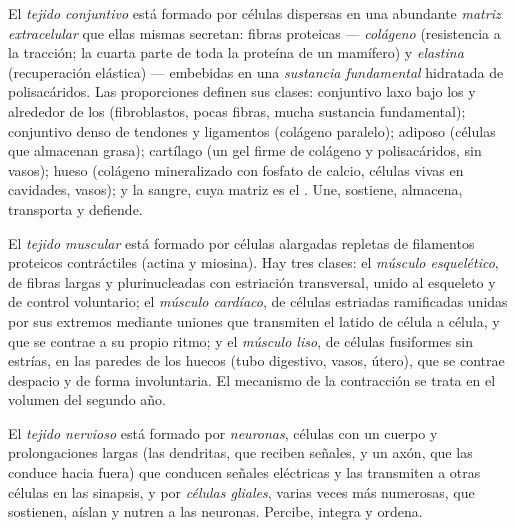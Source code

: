 \begin{definition}\label{def:b1:body-plans-tissues:connective}
El \emph{tejido conjuntivo} está formado por
células dispersas en una abundante \emph{matriz extracelular} que ellas mismas secretan: fibras proteicas ---
\emph{colágeno} (resistencia a la tracción; la cuarta parte
de toda la proteína de un mamífero) y \emph{elastina}
(recuperación elástica) --- embebidas en una \emph{sustancia fundamental}
hidratada de polisacáridos. Las proporciones definen sus clases: 
conjuntivo laxo bajo los  y alrededor de los  (fibroblastos,
pocas fibras, mucha sustancia fundamental);  conjuntivo denso de
tendones y ligamentos (colágeno paralelo);  adiposo (células que
almacenan grasa); cartílago (un gel firme de colágeno y polisacáridos, sin
vasos); hueso (colágeno mineralizado con fosfato de calcio, células vivas en
cavidades, vasos); y la sangre, cuya matriz es el . Une, sostiene,
almacena, transporta y defiende.
\end{definition}

\begin{definition}\label{def:b1:body-plans-tissues:muscle}
El \emph{tejido muscular} está formado por células
alargadas repletas de filamentos proteicos contráctiles (actina y miosina).
Hay tres clases: el \emph{músculo esquelético}, de fibras largas y
plurinucleadas con estriación transversal, unido al esqueleto y de control
voluntario; el \emph{músculo cardíaco}, de células estriadas ramificadas
unidas por sus extremos mediante uniones que transmiten el latido de célula
a célula, y que se contrae a su propio ritmo; y el \emph{músculo liso}, de
células fusiformes sin estrías, en las paredes de los  huecos (tubo
digestivo, vasos, útero), que se contrae despacio y de forma involuntaria.
El mecanismo de la contracción se trata en el volumen del segundo año.
\end{definition}

\begin{definition}\label{def:b1:body-plans-tissues:nervous}
El \emph{tejido nervioso} está formado por
\emph{neuronas}, células con un cuerpo y prolongaciones
largas (las dendritas, que reciben señales, y un axón, que las conduce hacia
fuera) que conducen señales eléctricas y las transmiten a otras células en
las sinapsis, y por \emph{células gliales}, varias veces
más numerosas, que sostienen, aíslan y nutren a las neuronas. Percibe,
integra y ordena.
\end{definition}

